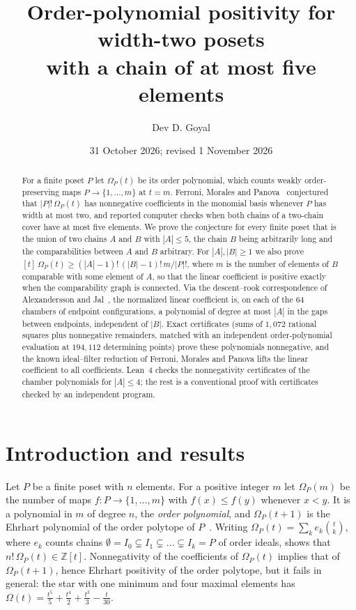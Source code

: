 \documentclass[11pt]{article}
\title{\textbf{Order-polynomial positivity for width-two posets\\ with a chain of at most five elements}}
\author{Dev D. Goyal}
\date{31 October 2026; revised 1 November 2026}
\theoremstyle{definition}
\theoremstyle{remark}
\begin{document}
\maketitle
\begin{abstract}
For a finite poset $P$ let $\Omega_P(t)$ be its order polynomial, which
counts weakly order-preserving maps $P\to\{1,\dots,m\}$ at $t=m$.
Ferroni, Morales and Panova~\cite{FMP} conjectured that $|P|!\,\Omega_P(t)$ has
nonnegative coefficients in the monomial basis whenever $P$ has width at
most two, and reported computer checks when both chains of a two-chain
cover have at most five elements. We prove the conjecture for every
finite poset that is the union of two chains $A$ and $B$ with $|A|\le5$,
the chain $B$ being arbitrarily long and the comparabilities between $A$
and $B$ arbitrary. For $|A|,|B|\ge1$ we also prove
$[t]\,\Omega_P(t)\ge(|A|-1)!\,(|B|-1)!\,m/|P|!$, where $m$ is the number of
elements of $B$ comparable with some element of $A$, so that the linear
coefficient is positive exactly when the comparability graph is
connected. Via the descent--rook correspondence of Alexandersson and
Jal~\cite{AJ}, the normalized linear coefficient is, on each of the $64$ chambers
of endpoint configurations, a polynomial of degree at most $|A|$ in the
gaps between endpoints, independent of $|B|$. Exact certificates (sums
of $1{,}072$ rational squares plus nonnegative remainders, matched with
an independent order-polynomial evaluation at $194{,}112$ determining
points) prove these polynomials nonnegative, and the known
ideal--filter reduction of Ferroni, Morales and Panova lifts the linear
coefficient to all coefficients. Lean~4 checks the nonnegativity
certificates of the chamber polynomials for $|A|\le4$; the rest is a
conventional proof with certificates checked by an independent program.
\end{abstract}

\section{Introduction and results}

Let $P$ be a finite poset with $n$ elements. For a positive integer $m$
let $\Omega_P(m)$ be the number of maps $f:P\to\{1,\dots,m\}$ with
$f(x)\le f(y)$ whenever $x<y$. It is a polynomial in $m$ of degree $n$,
the \emph{order polynomial}, and $\Omega_P(t+1)$ is the Ehrhart
polynomial of the order polytope of $P$~\cite{Stanley}. Writing
$\Omega_P(t)=\sum_k e_k\binom tk$, where $e_k$ counts chains
$\emptyset=I_0\subsetneq I_1\subsetneq\dots\subsetneq I_k=P$ of order
ideals, shows that $n!\,\Omega_P(t)\in\mathbb Z[t]$. Nonnegativity of
the coefficients of $\Omega_P(t)$ implies that of $\Omega_P(t+1)$, hence
Ehrhart positivity of the order polytope, but it fails in general: the
star with one minimum and four maximal elements has
$\Omega(t)=\tfrac{t^5}5+\tfrac{t^4}2+\tfrac{t^3}3-\tfrac t{30}$.
\end{document}
